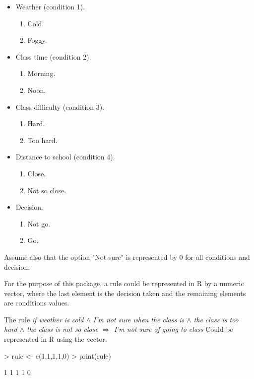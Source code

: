 \documentclass[a4paper]{article}
\begin{document}
\begin{itemize}
  \item Weather (condition 1).
    \begin{enumerate}
      \item Cold.
      \item Foggy. 
    \end{enumerate}
  \item Class time (condition 2). 
    \begin{enumerate}
      \item Morning.
      \item Noon. 
    \end{enumerate}
  \item Class difficulty (condition 3).
    \begin{enumerate}
      \item Hard.
      \item Too hard. 
    \end{enumerate}
  \item Distance to school (condition 4).
    \begin{enumerate}
      \item Close.
      \item Not so close. 
    \end{enumerate}
  \item Decision.
    \begin{enumerate}
      \item Not go.
      \item Go.
    \end{enumerate}
\end{itemize}

Assume also that the option "Not sure" is represented by 0 for all conditions and decision.

For the purpose of this package, a rule could be represented in R by a numeric vector, where the last element is the decision taken and the remaining elements are conditions values. 

The rule 
\emph{if weather is cold $\wedge$ I'm not sure when the class is $\wedge$ the class is too hard $\wedge$ the class is not so close
$\Rightarrow$ I'm not sure of going to class}
Could be represented in R using the vector:


\begin{Schunk}
\begin{Sinput}
> rule <- c(1,1,1,1,0)
> print(rule)
\end{Sinput}
\begin{Soutput}
[1] 1 1 1 1 0
\end{Soutput}
\end{Schunk}
\end{document}

